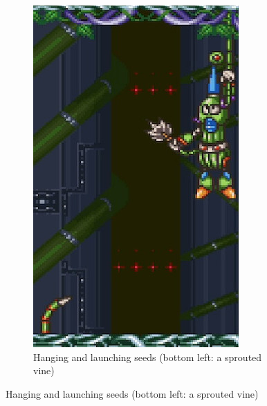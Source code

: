 \begin{figure}[htp]
\begin{subfigure}{0.4\linewidth}
		\includegraphics[width=\linewidth]{figures/X2/Wire_sponge/Sponge_hang.jpg}
		\caption{Hanging and launching seeds (bottom left: a sprouted vine)}
	\end{subfigure}
\end{figure}
